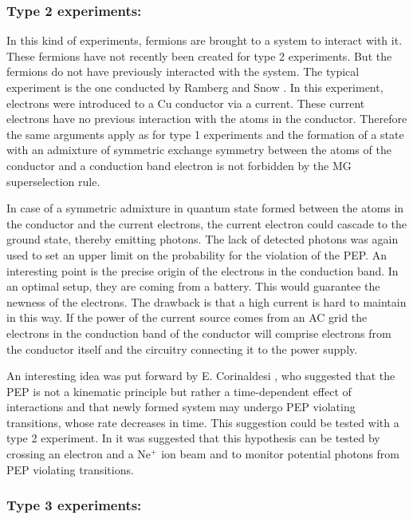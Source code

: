 \subsubsection{Type 2 experiments:}

In this kind of experiments, fermions are brought to a system to interact with it. These fermions have not recently been created for type 2 experiments. But the fermions do not have previously interacted with the system. The typical experiment is the one conducted by Ramberg and Snow \cite{RAMBERG1990}. In this experiment, electrons were introduced to a Cu conductor via a current. These current electrons have no previous interaction with the atoms in the conductor. Therefore the same arguments apply as for type 1 experiments and the formation of a state with an admixture of symmetric exchange symmetry between the atoms of the conductor and a conduction band electron is not forbidden by the MG superselection rule. 

In case of a symmetric admixture in quantum state formed between the atoms in the conductor and the current electrons, the current electron could cascade to the ground state, thereby emitting photons. The lack of detected photons was again used to set an upper limit on the probability for the violation of the PEP. An interesting point is the precise origin of the electrons in the conduction band. In an optimal setup, they are coming from a battery. This would guarantee the newness of the electrons. The drawback is that a high current is hard to maintain in this way. If the power of the current source comes from an AC grid the electrons in the conduction band of the conductor will comprise electrons from the conductor itself and the circuitry connecting it to the power supply.

An interesting idea was put forward by E. Corinaldesi \cite{Corinaldesi1967}, who suggested that the PEP is not a kinematic principle but rather a time-dependent effect of interactions and that newly formed system may undergo PEP violating transitions, whose rate decreases in time. This suggestion could be tested with a type 2 experiment. In \cite{Shimony2006} it was suggested that this hypothesis can be tested by crossing an electron and a Ne$^{+}$ ion beam and to monitor potential photons from PEP violating transitions.

\subsubsection{Type 3 experiments:}

